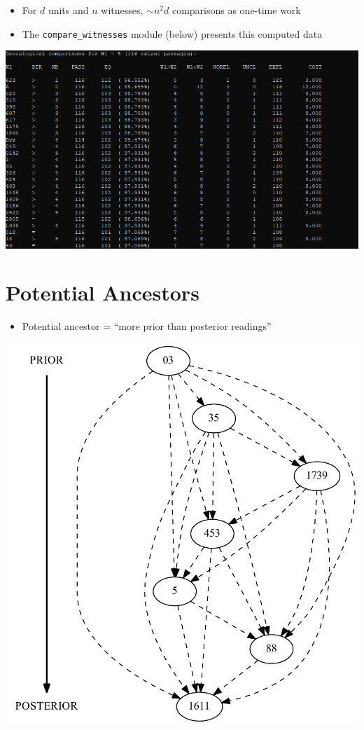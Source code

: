 \documentclass[10pt]{beamer}
\begin{document}
	\begin{frame}
		\begin{itemize}
			\item For $d$ units and $n$ witnesses, $\sim n^2d$ comparisons as one-time work
			\item The \texttt{compare\_witnesses} module (below) presents this computed data
		\end{itemize}
		\begin{center}
			\includegraphics[scale=0.5]{../img/compare-witnesses.png}
		\end{center}
	\end{frame}
	\section*{Potential Ancestors}
	\begin{frame}
		\begin{itemize}
			\item Potential ancestor = ``more prior than posterior readings''
		\end{itemize}
		\begin{center}
			\includegraphics[scale=0.4]{../img/potential-ancestors.pdf}
		\end{center}
	\end{frame}
\end{document}
